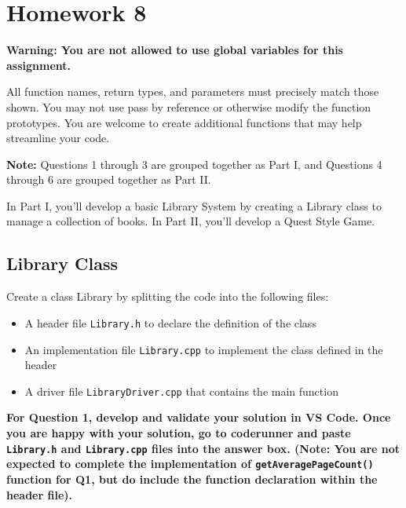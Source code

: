 \vspace{5cm}

\section{Homework 8}

\textbf{Warning: You are not allowed to use global variables for this assignment.}

All function names, return types, and parameters must precisely match those shown. You may not use pass by reference or otherwise modify the function prototypes. You are welcome to create additional functions that may help streamline your code. 

\textbf{Note:} Questions 1 through 3 are grouped together as Part I, and Questions 4 through 6 are grouped together as Part II.

In Part I, you'll develop a basic Library System by creating a Library class to manage a collection of books. In Part II, you'll develop a Quest Style Game. 

\subsection{Library Class} 


Create a class Library by splitting the code into the following files:
\begin{itemize}
    \item A header file \texttt{Library.h} to declare the definition of the class
    \item  An implementation file \texttt{Library.cpp} to implement the class defined in the header
    \item  A driver file \texttt{LibraryDriver.cpp} that contains the main function
\end{itemize}

\textbf{For Question 1, develop and validate your solution in VS Code. Once you are happy with your solution, go to coderunner and paste \texttt{Library.h} and \texttt{Library.cpp} files into the answer box. (Note: You are not expected to complete the implementation of \texttt{getAveragePageCount()} function for Q1, but do include the function declaration within the header file).} 

\vspace{10pt}

